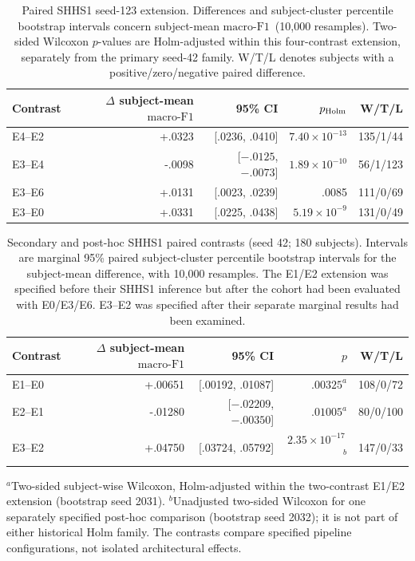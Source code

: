 \documentclass[10pt,a4paper]{article}
\newcommand{\mf}{\ensuremath{\mathrm{macro\text{-}F1}}}
\newcommand{\ci}{95\% CI}
\begin{document}
\begin{table}[H]
\centering\small
\caption{Paired SHHS1 seed-123 extension. Differences and subject-cluster percentile
bootstrap intervals concern subject-mean \mf\ (10,000 resamples). Two-sided Wilcoxon $p$-values
are Holm-adjusted within this four-contrast extension, separately from the primary seed-42 family.
W/T/L denotes subjects with a positive/zero/negative paired difference.}
\label{tab:sup_shhs_seed123_paired}
\begin{tabular}{lrrrr}
\toprule
Contrast & $\Delta$ subject-mean \mf & \ci & $p_{\rm Holm}$ & W/T/L \\
\midrule
E4--E2 & +.0323 & [.0236, .0410] & $7.40\times10^{-13}$ & 135/1/44 \\
E3--E4 & -.0098 & [$-.0125$, $-.0073$] & $1.89\times10^{-10}$ & 56/1/123 \\
E3--E6 & +.0131 & [.0023, .0239] & .0085 & 111/0/69 \\
E3--E0 & +.0331 & [.0225, .0438] & $5.19\times10^{-9}$ & 131/0/49 \\
\bottomrule
\end{tabular}
\end{table}

\begin{table}[H]
\centering\small
\caption{Secondary and post-hoc SHHS1 paired contrasts (seed 42; 180 subjects).
Intervals are marginal 95\% paired subject-cluster percentile bootstrap intervals for the
subject-mean difference, with 10,000 resamples. The E1/E2 extension was specified before their
SHHS1 inference but after the cohort had been evaluated with E0/E3/E6. E3--E2 was specified
after their separate marginal results had been examined.}
\label{tab:sup_shhs_secondary_paired}
\begin{tabular}{lrrrr}
\toprule
Contrast & $\Delta$ subject-mean \mf & \ci & $p$ & W/T/L \\
\midrule
E1--E0 & +.00651 & [.00192, .01087] & $.00325^{a}$ & 108/0/72 \\
E2--E1 & -.01280 & [$-.02209$, $-.00350$] & $.01005^{a}$ & 80/0/100 \\
E3--E2 & +.04750 & [.03724, .05792] & $2.35\times10^{-17}$\,$^{b}$ & 147/0/33 \\
\bottomrule
\end{tabular}

\smallskip
\begin{minipage}{0.96\textwidth}\footnotesize
$^{a}$Two-sided subject-wise Wilcoxon, Holm-adjusted within the two-contrast E1/E2 extension
(bootstrap seed 2031). $^{b}$Unadjusted two-sided Wilcoxon for one separately specified post-hoc
comparison (bootstrap seed 2032); it is not part of either historical Holm family. The contrasts
compare specified pipeline configurations, not isolated architectural effects.
\end{minipage}
\end{table}
\end{document}
